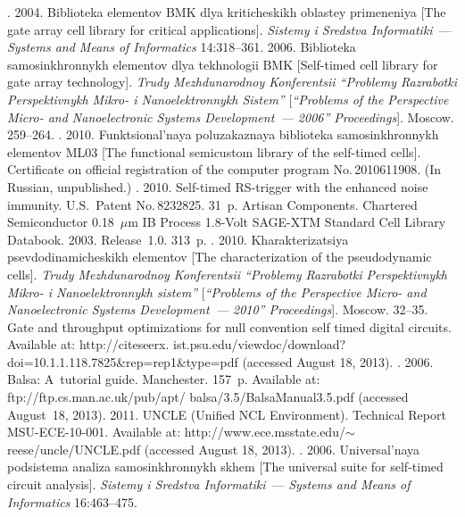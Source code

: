 \begin{multicols}{2}
{{\begin{thebibliography}{99}
. 2004. Biblioteka elementov BMK dlya kriticheskikh 
oblastey primeneniya [The gate array cell library for critical applications]. 
\textit{Sistemy i Sredstva Informatiki}~--- \textit{Systems and Means of Informatics}
14:318--361.
2006. Biblioteka samosinkhronnykh elementov dlya tekhnologii BMK 
[Self-timed cell library for gate array technology]. 
\textit{Trudy Mezhdunarodnoy Konferentsii ``Problemy Razrabotki Perspektivnykh Mikro- i 
Nanoelektronnykh Sistem''} [\textit{``Problems of the Perspective Micro- and 
Nanoelectronic Systems Development~--- 2006'' Proceedings}]. Moscow. 259--264.
. 
2010. Funktsional'naya poluza\-kaz\-naya biblioteka samosinkhronnykh elementov ML03 
[The functional semicustom library of the self-timed cells]. 
Certificate on official registration of the computer program No.\,2010611908. 
(In Russian, unpublished.)
. 2010. 
Self-timed RS-trigger with the enhanced noise immunity. 
U.S.\ Patent No.\,8232825. 31~p.
Artisan Components.  
Chartered Semiconductor 0.18~$\mu$m IB Process 1.8-Volt SAGE-XTM Standard Cell 
Library Databook. 2003. Release~1.0. 313~p.
. 2010. 
Kharakterizatsiya psevdodinamicheskikh elementov 
[The characterization of the pseudodynamic cells]. 
\textit{Trudy Mezhdunarodnoy Konferentsii ``Problemy Razrabotki Perspektivnykh Mikro- 
i Nanoelektronnykh sistem''} 
[\textit{``Problems of the Perspective Micro- and Nanoelectronic Systems 
Development~--- 2010'' Proceedings}]. Moscow. 32--35.
Gate and throughput optimizations for null convention self timed digital circuits. 
Available at: 
{\sf http://citeseerx. ist.psu.edu/viewdoc/download?doi=10.1.1.118.7825\&\linebreak rep=rep1\&type=pdf}
(accessed August 18, 2013).
. 2006. 
Balsa: A~tutorial guide. Manchester. 157~p. Available at: 
{\sf ftp://ftp.cs.man.ac.uk/pub/apt/ balsa/3.5/BalsaManual3.5.pdf}  (accessed August~18, 2013).
 2011. UNCLE (Unified NCL Environment). 
Technical Report MSU-ECE-10-001. Available at: 
{\sf http://www.ece.msstate.edu/$\sim$reese/uncle/UNCLE.pdf} (accessed August 18, 2013).
. 
2006. Universal'naya podsistema analiza samosinkhronnykh skhem 
[The universal suite for self-timed circuit analysis]. 
\textit{Sistemy i Sredstva Informatiki}~--- \textit{Systems and Means of Informatics} 
16:463--475.
{

}
\end{thebibliography}}}
\end{multicols}
